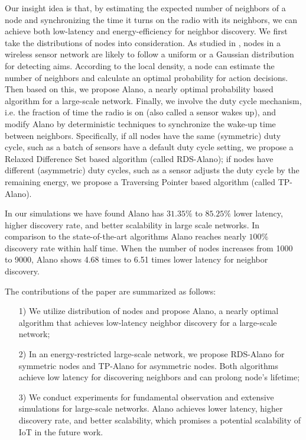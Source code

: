 Our insight idea is that, by estimating the expected number of neighbors of a node and synchronizing the time it turns on the radio with its neighbors, 
we can achieve both low-latency and energy-efficiency for neighbor discovery. 
We first take the distributions of nodes into consideration. As studied in \cite{wang2013gaussian}, nodes in a wireless sensor network are likely to follow a uniform or a Gaussian distribution for detecting aims. %
According to the local density, a node can estimate the number of neighbors and calculate an optimal probability for action decisions. Then based on this, we propose Alano, %
a nearly optimal probability based algorithm for a large-scale network. Finally, we involve the duty cycle mechanism, i.e. the fraction of time the radio is on (also called a sensor wakes up), and modify Alano by deterministic techniques to synchronize the wake-up time between neighbors. Specifically, if all nodes have the same (symmetric) duty cycle, such as a batch of sensors have a default duty cycle setting, we propose a Relaxed Difference Set based algorithm (called RDS-Alano); if nodes have different (asymmetric) duty cycles, such as a sensor adjusts the duty cycle by the remaining energy, we propose a Traversing Pointer based algorithm (called TP-Alano).

In our simulations we have found Alano has $31.35\%$ to $ 85.25\%$ lower latency, higher discovery rate, and better scalability  in large scale networks. %
In comparison to the state-of-the-art algorithms \cite{you2011aloha, sun2014hello, chen2015heterogeneous, bakht2012searchlight}
Alano reaches nearly $100\%$ discovery rate within half time. 
When the number of nodes increases from 1000 to 9000, 
Alano shows 4.68 times to 6.51 times lower latency for neighbor discovery.

The contributions of the paper are summarized as follows:
\begin{itemize}
\item[1)] We utilize distribution of nodes and propose Alano, a nearly optimal algorithm that achieves low-latency neighbor discovery for a large-scale network;
\item[2)] In an energy-restricted large-scale network, we propose RDS-Alano for symmetric nodes and TP-Alano for asymmetric nodes. Both algorithms achieve low latency for discovering neighbors and can prolong node's lifetime;
\item[3)] We conduct experiments for fundamental observation and extensive simulations for large-scale networks.  Alano achieves lower latency, higher discovery rate, and better scalability,
which promises a potential scalability of IoT in the future work.  %
\end{itemize}

